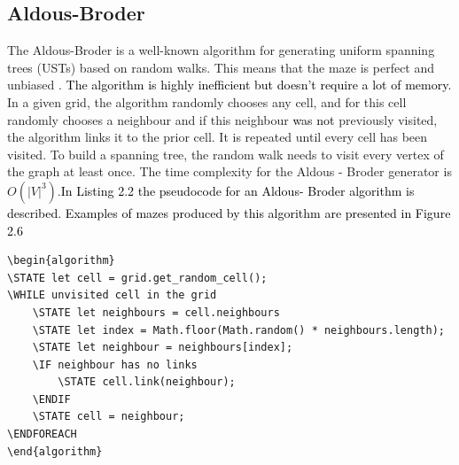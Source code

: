 \subsection{Aldous-Broder}
The Aldous-Broder is a well-known algorithm for generating uniform spanning trees (USTs) based on random walks. This means that the maze is perfect and unbiased \cite{Nunes}. \textcolor{black}{The algorithm is highly inefficient but doesn't require a lot of memory.} In a given grid, the algorithm randomly chooses any cell, and for this cell randomly chooses a neighbour and if this neighbour \textcolor{black}{was not} previously visited, the algorithm links it to the prior cell. It is repeated until every cell has been visited. To build a spanning tree, the random walk needs to visit every vertex of the graph at least once. The time complexity for the Aldous - Broder generator is $O(|V|^3)$.\textcolor{black}{In Listing 2.2 the pseudocode for an Aldous- Broder algorithm is described. Examples of mazes produced by this algorithm are presented in Figure 2.6}
\newline
\begin{lstlisting}[caption={Pseudocode for an Aldous-Broder algorithm}]
\begin{algorithm}
\STATE let cell = grid.get_random_cell();
\WHILE unvisited cell in the grid
	\STATE let neighbours = cell.neighbours
	\STATE let index = Math.floor(Math.random() * neighbours.length);
	\STATE let neighbour = neighbours[index];
	\IF neighbour has no links
		\STATE cell.link(neighbour);
	\ENDIF
	\STATE cell = neighbour;
\ENDFOREACH
\end{algorithm}
\end{lstlisting}

